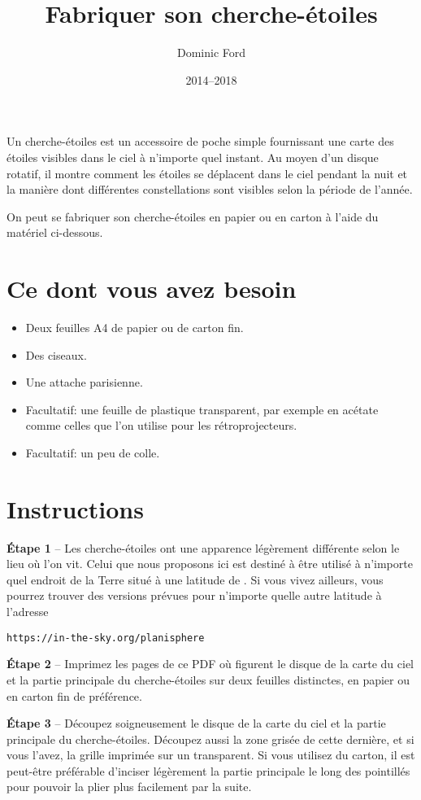 \documentclass[a4paper,onecolumn,10pt]{article}
\title{Fabriquer son cherche-étoiles}
\author{Dominic Ford}
\date{2014--2018}
\begin{document}
\maketitle
\setcounter{footnote}{1}

Un cherche-étoiles est un accessoire de poche simple fournissant une carte des étoiles visibles dans le ciel à n’importe quel instant. Au moyen d’un disque rotatif, il montre comment les étoiles se déplacent dans le ciel pendant la nuit et la manière dont différentes constellations sont visibles selon la période de l’année.

On peut se fabriquer son cherche-étoiles en papier ou en carton à l’aide du matériel ci-dessous.

\section*{Ce dont vous avez besoin}

\begin{itemize}
\item Deux feuilles A4 de papier ou de carton fin.
\item Des ciseaux.
\item Une attache parisienne.
\item Facultatif: une feuille de plastique transparent, par exemple en acétate comme celles que l’on utilise pour les rétroprojecteurs.
\item Facultatif: un peu de colle.
\end{itemize}

\section*{Instructions}

{\bf Étape 1} -- Les cherche-étoiles ont une apparence légèrement différente selon le lieu où l’on vit. Celui que nous proposons ici est destiné à être utilisé à n’importe quel endroit de la Terre situé à une latitude de . Si vous vivez ailleurs, vous pourrez trouver des versions prévues pour n’importe quelle autre latitude à l’adresse

\centerline{\tt https://in-the-sky.org/planisphere}

{\bf Étape 2} -- Imprimez les pages de ce PDF où figurent le disque de la carte du ciel et la partie principale du cherche-étoiles sur deux feuilles distinctes, en papier ou en carton fin de préférence.

{\bf Étape 3} -- Découpez soigneusement le disque de la carte du ciel et la partie principale du cherche-étoiles. Découpez aussi la zone grisée de cette dernière, et si vous l’avez, la grille imprimée sur un transparent. Si vous utilisez du carton, il est peut-être préférable d’inciser légèrement la partie principale le long des pointillés pour pouvoir la plier plus facilement par la suite.
\end{document}
